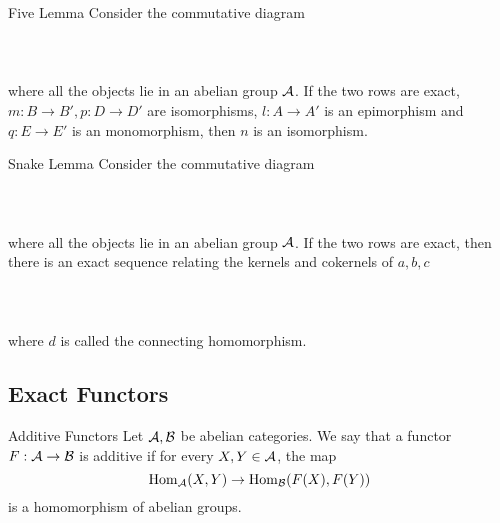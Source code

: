 \documentclass[a4paper]{article}
\begin{document}
\begin{lmm}{Five Lemma}{} Consider the commutative diagram \\~\\
\\~\\
where all the objects lie in an abelian group $\mathcal{A}$. If the two rows are exact, $m:B\to B',p:D\to D'$ are isomorphisms, $l:A\to A'$ is an epimorphism and $q:E\to E'$ is an monomorphism, then $n$ is an isomorphism. 
\end{lmm}

\begin{lmm}{Snake Lemma}{} Consider the commutative diagram \\~\\
\\~\\
where all the objects lie in an abelian group $\mathcal{A}$. If the two rows are exact, then there is an exact sequence relating the kernels and cokernels of $a,b,c$ \\~\\
\\~\\
where $d$ is called the connecting homomorphism. 
\end{lmm}

\subsection{Exact Functors}
\begin{defn}{Additive Functors}{} Let $\mathcal{A},\mathcal{B}$ be abelian categories. We say that a functor $F:\mathcal{A}\to\mathcal{B}$ is additive if for every $X,Y\in\mathcal{A}$, the map $$\operatorname{Hom}_{\mathcal{A}}(X,Y)\to\operatorname{Hom}_{\mathcal{B}}(F(X),F(Y))$$ is a homomorphism of abelian groups. 
\end{defn}
\end{document}
